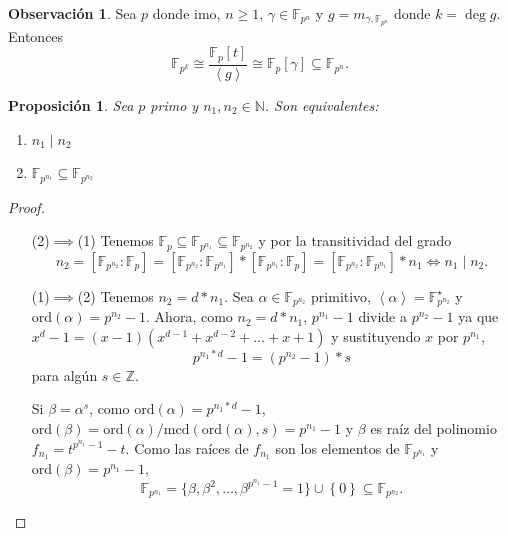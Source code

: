\documentclass[10pt, spanish]{report}
\newtheorem{prop}[tma]{Proposición}
\theoremstyle{definition}
\newtheorem*{obs}{Observación}
\newcommand{\N}{\mathbb{N}}
\newcommand{\Z}{\mathbb{Z}}
\newcommand{\F}{\mathbb{F}}
\newcommand{\ord}[1]{\text{ord}(#1)}
\newcommand{\mcd}[1]{\text{mcd}(#1)}
\renewcommand{\geq}{\geqslant}
\newcommand{\fecha}[1]{\marginpar{\underline{\footnotesize{#1}}}}
\begin{document}
\fecha{22/03} %
\begin{obs}
    Sea $p$ donde imo, $n\geq1$, $\gamma\in\F_{p^n}$ y $g=m_{\gamma,\F_{p^n}}$
    donde $k=\deg{g}$. Entonces \[\F_{p^k}\cong\frac{\F_p[t]}{\left< g \right>}
        \cong\F_p[\gamma]\subseteq\F_{p^n}.\]
\end{obs}

\begin{prop}\label{prop:subcuerposdiv}
    Sea $p$ primo y $n_1,n_2\in\N$. Son equivalentes:
    \begin{enumerate}
        \item $n_1\mid n_2$
        \item $\F_{p^{n_1}}\subseteq \F_{p^{n_2}}$
    \end{enumerate}
\end{prop}

\begin{proof}\hspace{0pt}
    \begin{itemize}[itemindent=36pt]
        \item[(2)$\implies$(1)] Tenemos $\F_p\subseteq\F_{p^{n_1}}\subseteq
            \F_{p^{n_2}}$ y por la transitividad del grado
            \[n_2=\left[ \F_{p^{n_2}}:\F_p \right]=
            \left[\F_{p^{n_2}}:\F_{p^{n_1}}\right]*
            \left[ \F_{p^{n_1}}:\F_p\right]=
            \left[\F_{p^{n_2}}:\F_{p^{n_1}}\right]*n_1
            \Leftrightarrow n_1\mid n_2.\]
        \item[(1)$\implies$(2)] Tenemos $n_2=d*n_1$. Sea $\alpha\in\F_{p^{n_2}}$
            primitivo, $\left< \alpha \right>=\F_{p^{n_2}}^\star$ y
            $\ord{\alpha}=p^{n_2}-1$. Ahora, como $n_2=d*n_1$, $p^{n_1}-1$
            divide a $p^{n_2}-1$ ya que
            $x^d-1=(x-1)(x^{d-1}+x^{d-2}+\ldots+x+1)$ y sustituyendo $x$ por
            $p^{n_1}$,
            \[p^{n_1*d}-1=(p^{n_2}-1)*s\]
            para algún $s\in\Z$.

            Si $\beta=\alpha^s$, como $\ord{\alpha}=p^{n_1*d}-1$, $\ord{
            \beta}={\ord{\alpha}}/{\mcd{\ord{\alpha},s}}=p^{n_1}-1$ y
            $\beta$ es raíz del polinomio $f_{n_1}=t^{p^{n_1}-1}-t$.
            Como las raíces de $f_{n_1}$ son los elementos de $\F_{p^{n_1}}$ y
            $\ord{\beta}=p^{n_1}-1$,
            \[\F_{p^{n_1}}=\{\beta,\beta^2,\ldots,\beta^{p^{n_1}-1}=1
            \}\cup \left\{ 0 \right\}\subseteq\F_{p^{n_2}}.\]
    \end{itemize}\vspace{-2.75em}
\end{proof}
\end{document}
